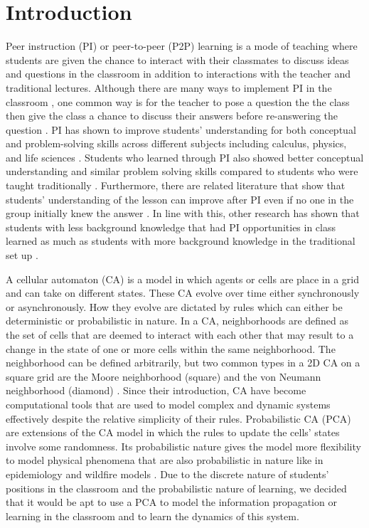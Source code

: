 \documentclass[10pt,a4paper,twoside]{article}
\begin{document}
\section{Introduction}\label{sec:intro}
Peer instruction (PI) or peer-to-peer (P2P) learning is a mode of teaching where students are given the chance to interact with their classmates to discuss ideas and questions in the classroom in addition to interactions with the teacher and traditional lectures. Although there are many ways to implement PI in the classroom \cite{knight2018peer}, one common way is for the teacher to pose a question the the class then give the class a chance to discuss their answers before re-answering the question \cite{crouch2001peer}. PI has shown to improve students' understanding for both conceptual and problem-solving skills across different subjects including calculus, physics, and life sciences \cite{crouch2001peer,smith2009peer}. Students who learned through PI also showed better conceptual understanding and similar problem solving skills compared to students who were taught traditionally \cite{lasry2008peer}. Furthermore, there are related literature that show that students' understanding of the lesson can improve after PI even if no one in the group initially knew the answer \cite{smith2009peer}. In line with this, other research has shown that students with less background knowledge that had PI opportunities in class learned as much as students with more background knowledge in the traditional set up \cite{lasry2008peer}.

\noindent A cellular automaton (CA) is a model in which agents or cells are place in a grid and can take on different states. These CA evolve over time either synchronously or asynchronously. How they evolve are dictated by rules which can either be deterministic or probabilistic in nature. In a CA, neighborhoods are defined as the set of cells that are deemed to interact with each other that may result to a change in the state of one or more cells within the same neighborhood. The neighborhood can be defined arbitrarily, but two common types in a 2D CA on a square grid are the Moore neighborhood (square) and the von Neumann neighborhood (diamond) \cite{weisstein2002cellular}. Since their introduction, CA have become computational tools that are used to model complex and dynamic systems effectively despite the relative simplicity of their rules. Probabilistic CA (PCA) are extensions of the CA model in which the rules to update the cells' states involve some randomness. Its probabilistic nature gives the model more flexibility to model physical phenomena that are also probabilistic in nature like in epidemiology and wildfire models \cite{louis2018probabilistic}. Due to the discrete nature of students' positions in the classroom and the probabilistic nature of learning, we decided that it would be apt to use a PCA to model the information propagation or learning in the classroom and to learn the dynamics of this system.
\end{document}
